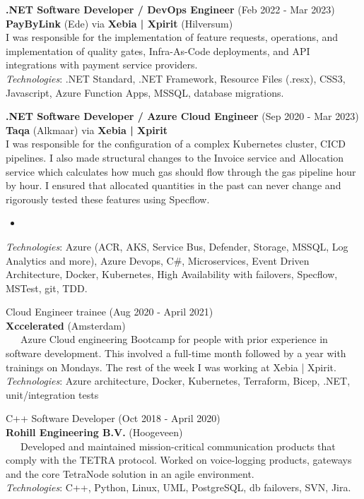 \documentclass[a4paper,8pt]{article}
\begin{document}
\textbf{.NET Software Developer / DevOps Engineer} (Feb 2022 - Mar 2023) \\
\textbf{PayByLink} (Ede) via \textbf{Xebia | Xpirit} (Hilversum) \\
 I was responsible for the implementation of feature requests, operations, and implementation of quality gates, Infra-As-Code deployments, and API integrations with payment service providers.\\
\textit{Technologies}: .NET Standard, .NET Framework, Resource Files (.resx), CSS3, Javascript, Azure Function Apps, MSSQL, database migrations.


\textbf{.NET Software Developer / Azure Cloud Engineer} (Sep 2020 - Mar 2023) \\
\textbf{Taqa} (Alkmaar) via \textbf{Xebia | Xpirit} \\
 I was responsible for the configuration of a complex Kubernetes cluster, CI\/CD pipelines. 
 I also made structural changes to the Invoice service and Allocation service which calculates how much gas should flow through the gas pipeline hour by hour. I ensured that allocated quantities in the past can never change and rigorously tested these features using Specflow. \\
 \begin{itemize}
  \item 
 \end{itemize}
\textit{Technologies}: Azure (ACR, AKS, Service Bus, Defender, Storage, MSSQL, Log Analytics and more), Azure Devops, C\#,  Microservices, Event Driven Architecture, Docker, Kubernetes, High Availability with failovers, Specflow, MSTest, git, TDD. 

Cloud Engineer trainee (Aug 2020 - April 2021) \\
\textbf{Xccelerated} (Amsterdam) \\
\ \ \ Azure Cloud engineering Bootcamp for people with prior experience in software development. This involved a full-time month followed by a year with trainings on Mondays.  The rest of the week I was working at Xebia | Xpirit. \\
\textit{Technologies}: Azure architecture, Docker, Kubernetes, Terraform, Bicep, .NET, unit/integration tests

C++ Software Developer (Oct 2018 - April 2020) \\
\textbf{Rohill Engineering B.V.} (Hoogeveen) \\
\ \ \ Developed and maintained mission-critical communication products that comply with the TETRA protocol. Worked on voice-logging products, gateways and the core TetraNode solution in an agile environment. \\
\textit{Technologies}: C++, Python, Linux, UML, PostgreSQL, db failovers, SVN, Jira.
\end{document}
